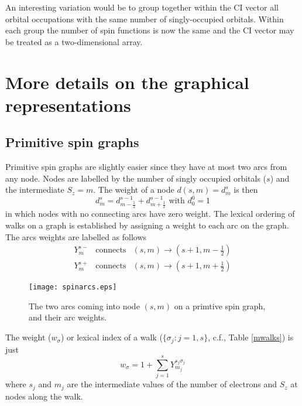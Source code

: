 \documentclass[fullpage,12pt,fleqn]{article}
\newcommand{\half}{\frac{1}{2}}
\begin{document}
An interesting variation would be to group together within the CI
vector all orbital occupations with the same number of singly-occupied
orbitals.  Within each group the number of spin functions is now the
same and the CI vector may be treated as a two-dimensional array.

\section{More details on the graphical representations}

\subsection{Primitive spin graphs}

Primitive spin graphs are slightly easier since they have at most two
arcs from any node.  Nodes are labelled by the number of singly
occupied orbitals ($s$) and the intermediate $S_z=m$.  The weight of a
node $d(s,m)=d^s_m$ is then
\begin{equation}
 d^s_m = d^{s-1}_{m-\half} + d^{s-1}_{m+\half} \mbox{\ with\ } d^0_0 =
1 \label{spinnodeweight}
\end{equation}
in which nodes with no connecting arcs have zero weight.
The lexical ordering of walks on a graph is established by assigning a
weight to each arc on the graph.  The arcs weights are labelled as
follows
\begin{eqnarray}
 Y^{s-}_m & \mbox{connects} & (s,m) \rightarrow (s+1,m-\half ) \\
 Y^{s+}_m & \mbox{connects} & (s,m) \rightarrow (s+1,m+\half )
\end{eqnarray}

\begin{figure}[htbp]

\center

\texttt{[image: spinarcs.eps]}
\caption{\label{spinarcs} The two arcs coming into node $(s,m)$ on a
primtive spin graph, and their arc weights.}
\end{figure}
  
 The weight ($w_{\sigma}$) or lexical index of a walk
($\{\sigma_j:j=1,s\}$, c.f., Table \ref{mwalks}) is just
\begin{equation}
 w_{\sigma} = 1 + \sum_{j=1}^{s} Y_{m_j}^{s_j \sigma_j} \label{spinwalkweight}
\end{equation}
where $s_j$ and $m_j$ are the intermediate values of the number of
electrons and $S_z$ at nodes along the walk. 
\end{document}
